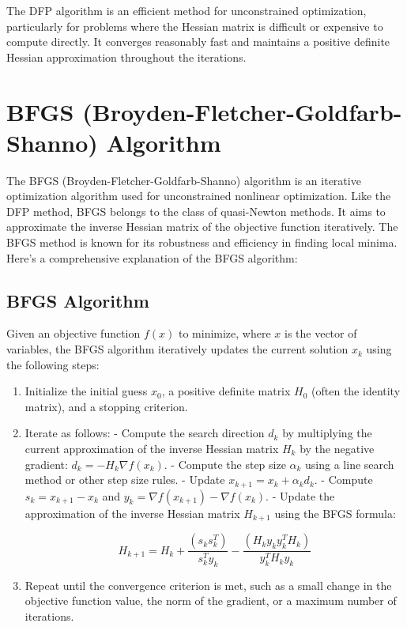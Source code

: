 \documentclass[a4paper]{article}
\begin{document}
The DFP algorithm is an efficient method for unconstrained optimization, particularly for problems where the Hessian matrix is difficult or expensive to compute directly. It converges reasonably fast and maintains a positive definite Hessian approximation throughout the iterations.

\section{BFGS (Broyden-Fletcher-Goldfarb-Shanno) Algorithm}

The BFGS (Broyden-Fletcher-Goldfarb-Shanno) algorithm is an iterative optimization algorithm used for unconstrained nonlinear optimization. Like the DFP method, BFGS belongs to the class of quasi-Newton methods. It aims to approximate the inverse Hessian matrix of the objective function iteratively. The BFGS method is known for its robustness and efficiency in finding local minima. Here's a comprehensive explanation of the BFGS algorithm:

\subsection{BFGS Algorithm}

Given an objective function $f(x)$ to minimize, where $x$ is the vector of variables, the BFGS algorithm iteratively updates the current solution $x_k$ using the following steps:

\begin{enumerate}
  \item Initialize the initial guess $x_0$, a positive definite matrix $H_0$ (often the identity matrix), and a stopping criterion.

  \item Iterate as follows:
     - Compute the search direction $d_k$ by multiplying the current approximation of the inverse Hessian matrix $H_k$ by the negative gradient: $d_k = -H_k \nabla f(x_k)$.
     - Compute the step size $\alpha_k$ using a line search method or other step size rules.
     - Update $x_{k+1} = x_k + \alpha_k d_k$.
     - Compute $s_k = x_{k+1} - x_k$ and $y_k = \nabla f(x_{k+1}) - \nabla f(x_k)$.
     - Update the approximation of the inverse Hessian matrix $H_{k+1}$ using the BFGS formula:

\[
H_{k+1} = H_k + \frac{(s_k s_k^T)}{s_k^T y_k} - \frac{(H_k y_k y_k^T H_k)}{y_k^T H_k y_k}
\]

  \item Repeat until the convergence criterion is met, such as a small change in the objective function value, the norm of the gradient, or a maximum number of iterations.
\end{enumerate}
\end{document}
